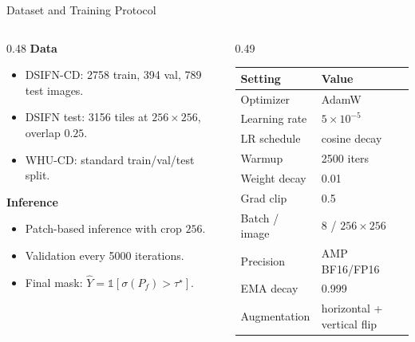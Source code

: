 \begin{frame}{Dataset and Training Protocol}
    \begin{columns}[T,onlytextwidth]
        \begin{column}{0.48\textwidth}
            \small
            \textbf{Data}
            \begin{itemize}
                \item DSIFN-CD: 2758 train, 394 val, 789 test images.
                \item DSIFN test: 3156 tiles at \(256\times256\), overlap \(0.25\).
                \item WHU-CD: standard train/val/test split.
            \end{itemize}

            \vspace{0.4em}
            \textbf{Inference}
            \begin{itemize}
                \item Patch-based inference with crop \(256\).
                \item Validation every 5000 iterations.
                \item Final mask: \(\hat{Y}=\mathbb{1}[\sigma(P_f)>\tau^\star]\).
            \end{itemize}
        \end{column}
        \begin{column}{0.49\textwidth}
            \scriptsize
            \begin{tabular}{ll}
                \toprule
                \textbf{Setting} & \textbf{Value} \\
                \midrule
                Optimizer & AdamW \\
                Learning rate & \(5\times10^{-5}\) \\
                LR schedule & cosine decay \\
                Warmup & 2500 iters \\
                Weight decay & 0.01 \\
                Grad clip & 0.5 \\
                Batch / image & 8 / \(256\times256\) \\
                Precision & AMP BF16/FP16 \\
                EMA decay & 0.999 \\
                Augmentation & horizontal + vertical flip \\
                \bottomrule
            \end{tabular}
        \end{column}
    \end{columns}
\end{frame}

